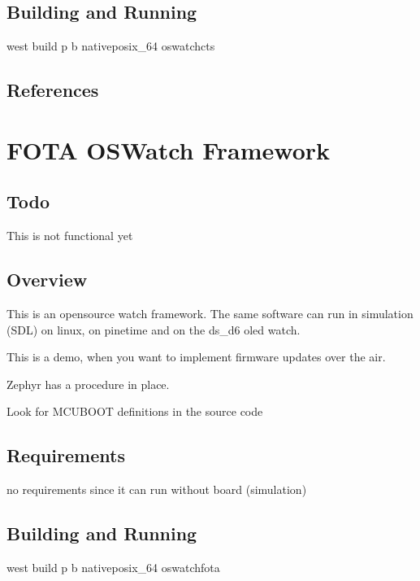 \documentclass[letterpaper,10pt,english]{sphinxmanual}
\begin{document}
\subsection{Building and Running}
\label{\detokenize{samples/oswatch-ctsREADME:building-and-running}}
west build \sphinxhyphen{}p \sphinxhyphen{}b  native\sphinxhyphen{}posix\_64 oswatch\sphinxhyphen{}cts


\subsection{References}
\label{\detokenize{samples/oswatch-ctsREADME:references}}

\section{FOTA OSWatch Framework}
\label{\detokenize{samples/oswatch-fotaREADME:fota-oswatch-framework}}\label{\detokenize{samples/oswatch-fotaREADME:oswatch}}\label{\detokenize{samples/oswatch-fotaREADME::doc}}

\subsection{Todo}
\label{\detokenize{samples/oswatch-fotaREADME:todo}}
This is not functional yet


\subsection{Overview}
\label{\detokenize{samples/oswatch-fotaREADME:overview}}
This is an opensource watch framework.
The same software can run in simulation (SDL) on linux, on pinetime and on the ds\_d6 oled watch.

This is a demo, when you want to implement firmware updates over the air.

Zephyr has a procedure in place.

Look for MCUBOOT definitions in the source code


\subsection{Requirements}
\label{\detokenize{samples/oswatch-fotaREADME:requirements}}
no requirements since it can run without board (simulation)


\subsection{Building and Running}
\label{\detokenize{samples/oswatch-fotaREADME:building-and-running}}
west build \sphinxhyphen{}p \sphinxhyphen{}b  native\sphinxhyphen{}posix\_64 oswatch\sphinxhyphen{}fota
\end{document}
